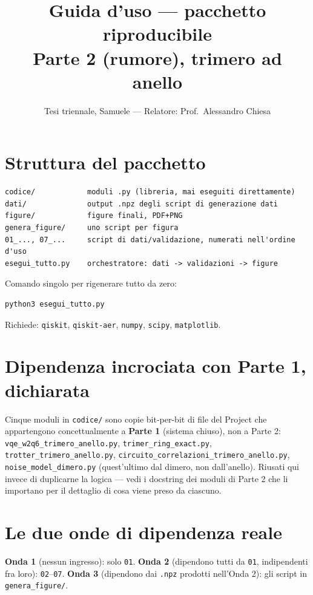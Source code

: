 \documentclass[11pt,a4paper]{article}
\title{Guida d'uso --- pacchetto riproducibile\\Parte 2 (rumore), trimero ad anello}
\author{Tesi triennale, Samuele --- Relatore: Prof.\ Alessandro Chiesa}
\date{}
\begin{document}
\sloppy
\maketitle

\tableofcontents

\section{Struttura del pacchetto}

\begin{verbatim}
codice/            moduli .py (libreria, mai eseguiti direttamente)
dati/              output .npz degli script di generazione dati
figure/            figure finali, PDF+PNG
genera_figure/     uno script per figura
01_..., 07_...     script di dati/validazione, numerati nell'ordine d'uso
esegui_tutto.py    orchestratore: dati -> validazioni -> figure
\end{verbatim}

Comando singolo per rigenerare tutto da zero:
\begin{verbatim}
python3 esegui_tutto.py
\end{verbatim}
Richiede: \texttt{qiskit}, \texttt{qiskit-aer}, \texttt{numpy}, \texttt{scipy}, \texttt{matplotlib}.

\section{Dipendenza incrociata con Parte 1, dichiarata}

Cinque moduli in \texttt{codice/} sono copie bit-per-bit di file del
Project che appartengono concettualmente a \textbf{Parte 1} (sistema
chiuso), non a Parte 2: \texttt{vqe\_w2q6\_\allowbreak trimero\_anello.py},
\texttt{trimer\_ring\_exact.py}, \texttt{trotter\_\allowbreak trimero\_anello.py},
\texttt{circuito\_\allowbreak correlazioni\_\allowbreak trimero\_anello.py},
\texttt{noise\_model\_dimero.py} (quest'ultimo dal dimero, non
dall'anello). Riusati qui invece di duplicarne la logica --- vedi i
docstring dei moduli di Parte 2 che li importano per il dettaglio di
cosa viene preso da ciascuno.

\section{Le due onde di dipendenza reale}

\textbf{Onda 1} (nessun ingresso): solo \texttt{01}. \textbf{Onda 2}
(dipendono tutti da \texttt{01}, indipendenti fra loro):
\texttt{02}--\texttt{07}. \textbf{Onda 3} (dipendono dai \texttt{.npz}
prodotti nell'Onda 2): gli script in \texttt{genera\_figure/}.
\end{document}
